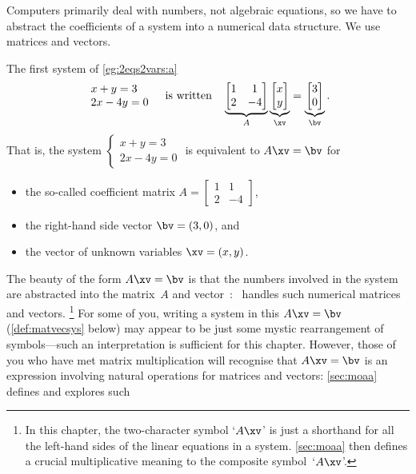Computers primarily deal with numbers, not algebraic equations, so we have to abstract the coefficients of a system into a numerical data structure.
We use matrices and vectors.
\begin{example} 
The first system of \cref{eg:2eqs2vars:a}
\begin{equation*}
\begin{array}{l} x+y=3\\2x-4y=0 \end{array}
\quad\text{is written}\quad
\underbrace{\begin{bmatrix} 1&1\\2&-4 \end{bmatrix}}_A
\underbrace{\begin{bmatrix} x\\y \end{bmatrix}}_\xv
=\underbrace{\begin{bmatrix} 3\\0 \end{bmatrix}}_\bv .
\end{equation*}
That is, the system \(\begin{cases} x+y=3\\2x-4y=0 \end{cases}\)
is equivalent to \(A\xv=\bv\) for
\begin{itemize}
\item the so-called coefficient matrix \(A=\begin{bmatrix} 1&1\\2&-4 \end{bmatrix}\), 
\item the right-hand side vector \(\bv=(3,0)\), and 
\item the vector of unknown variables \(\xv=(x,y)\).
\end{itemize}

\end{example}


The beauty of the form \(A\xv=\bv\) is that the numbers involved in the system are abstracted into the matrix~\(A\) and vector~\bv: \script\ handles such numerical matrices and vectors.%
\footnote{In this chapter, the two-character symbol `\(A\xv\)' is just a shorthand for all the left-hand sides of the linear equations in a system.
\cref{sec:moaa} then defines a crucial multiplicative meaning to the composite symbol~`\(A\xv\)'.}
For some of you, writing a system in this  \(A\xv=\bv\) (\cref{def:matvecsys} below) may appear to be just some mystic rearrangement of symbols---such an interpretation is sufficient for this chapter.
However, those of you who have met matrix multiplication will recognise that \(A\xv=\bv\) is an expression involving natural operations for matrices and vectors: \cref{sec:moaa} defines and explores such 


